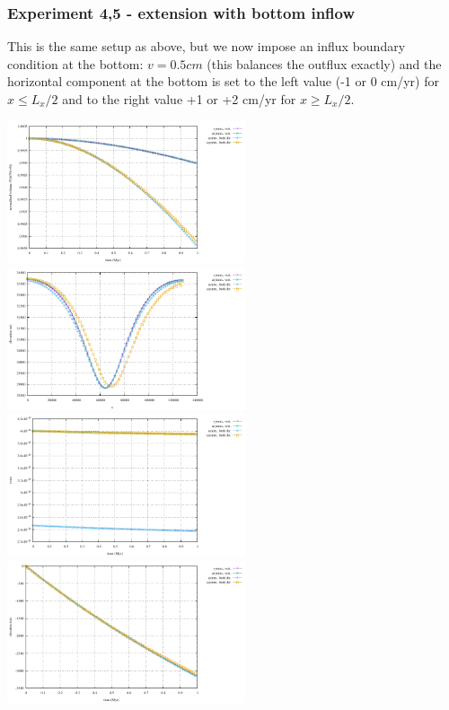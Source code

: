 \subsubsection*{Experiment 4,5 - extension with bottom inflow}

This is the same setup as above, but we now impose an influx boundary condition at the bottom: $v=0.5cm$ (this balances the outflux exactly) and 
the horizontal component at the bottom is set to the left value (-1 or 0 cm/yr) for $x\leq L_x/2$ and to the right value +1 or +2 cm/yr for $x\geq L_x/2$.

\begin{center}
\includegraphics[width=7cm]{python_codes/fieldstone_54/images/exp4-5/volume.pdf}
\includegraphics[width=7cm]{python_codes/fieldstone_54/images/exp4-5/surface.pdf}\\
\includegraphics[width=7cm]{python_codes/fieldstone_54/images/exp4-5/vrms.pdf}
\includegraphics[width=7cm]{python_codes/fieldstone_54/images/exp4-5/elevation.pdf}\\
\end{center}

